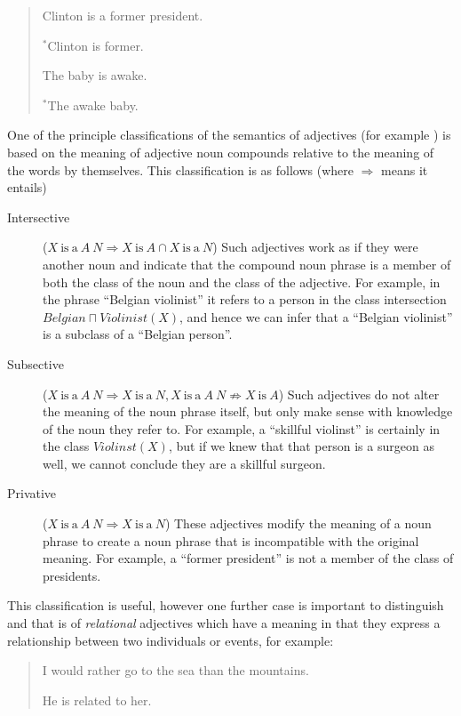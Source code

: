\documentclass[11pt]{article}
\begin{document}
\begin{quote}
	Clinton is a former president.
	
	$^*$Clinton is former.
	
	The baby is awake.
	
	$^*$The awake baby.
\end{quote}

One of the principle classifications of the semantics of adjectives (for example \cite{partee2003there}) is based on the meaning of adjective noun compounds relative to the meaning of the words by themselves. This classification is as follows (where $\Rightarrow$ means it entails)

\begin{description}
\item[Intersective] ($X\mathrm{~is~a~}A~N \Rightarrow X\mathrm{~is~}A \cap X\mathrm{~is~a~}N$) Such adjectives work as if they were another noun and indicate that the compound noun phrase is a member of both the class of the noun and the class of the adjective. For example, in the phrase ``Belgian violinist'' it refers to a person in the class intersection $Belgian \sqcap Violinist(X)$, and hence we can infer that a ``Belgian violinist'' is a subclass of a ``Belgian person''.
\item[Subsective] ($X\mathrm{~is~a~}A~N \Rightarrow X\mathrm{~is~a~}N, X\mathrm{~is~a~}A~N \not\Rightarrow X\mathrm{~is~}A$) Such adjectives do not alter the meaning of the noun phrase itself, but only make sense with knowledge of the noun they refer to. For example, a ``skillful violinst'' is certainly in the class $Violinst(X)$, but if we knew that that person is a surgeon as well, we cannot conclude they are a skillful surgeon.
\item[Privative] ($X\mathrm{~is~a~}A~N \Rightarrow X\mathrm{~is~a~}N$) These adjectives modify the meaning of a noun phrase to create a noun phrase that is incompatible with the original meaning. For example, a ``former president'' is not a member of the class of presidents.
\end{description}

This classification is useful, however one further case is important to distinguish and that is of \emph{relational} adjectives which have a meaning in that they express a relationship between two individuals or events, for example:

\begin{quote}
I would rather go to the sea than the mountains.

He is related to her.
\end{quote}
\end{document}
